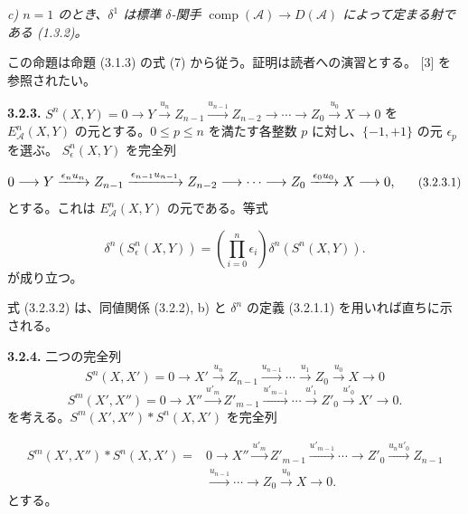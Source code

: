 \clearpage
{}%
\begingroup\small\setlength{\parskip}{0pt}\setlength{\emergencystretch}{1.5em}
\setlength{\abovedisplayskip}{4pt plus 2pt minus 2pt}%
\setlength{\belowdisplayskip}{4pt plus 2pt minus 2pt}%

\noindent\textit{c) $n=1$ のとき、$\delta^1$ は標準 $\delta$-関手
$\operatorname{comp}(\mathcal A)\longrightarrow D(\mathcal A)$
によって定まる射である (1.3.2)。}

この命題は命題 (3.1.3) の式 (7) から従う。証明は読者への演習とする。
[3] を参照されたい。

\medskip\noindent\textbf{3.2.3.}\quad
$S^n(X,Y)=0\longrightarrow Y\xrightarrow{u_n}Z_{n-1}
\xrightarrow{u_{n-1}}Z_{n-2}\longrightarrow\cdots\longrightarrow Z_0
\xrightarrow{u_0}X\longrightarrow0$
を $E_{\mathcal A}^{n}(X,Y)$ の元とする。$0\leq p\leq n$ を満たす各整数
$p$ に対し、$\{-1,+1\}$ の元 $\epsilon_p$ を選ぶ。
$S_{\epsilon}^{n}(X,Y)$ を完全列

\begin{equation}
\resizebox{0.94\textwidth}{!}{$\displaystyle
0\longrightarrow Y\xrightarrow{\epsilon_nu_n}Z_{n-1}
\xrightarrow{\epsilon_{n-1}u_{n-1}}Z_{n-2}\longrightarrow\cdots
\longrightarrow Z_0\xrightarrow{\epsilon_0u_0}X\longrightarrow0,
$}
\tag{3.2.3.1}
\end{equation}
とする。これは $E_{\mathcal A}^{n}(X,Y)$ の元である。等式

\begin{equation}
\delta^n(S_{\epsilon}^{n}(X,Y))=
\left(\prod_{i=0}^{n}\epsilon_i\right)\delta^n(S^n(X,Y)).
\tag{3.2.3.2}
\end{equation}
が成り立つ。

式 (3.2.3.2) は、同値関係 (3.2.2), b) と $\delta^n$ の定義
(3.2.1.1) を用いれば直ちに示される。

\medskip\noindent\textbf{3.2.4.}\quad
二つの完全列
\[
S^n(X,X')=0\longrightarrow X'\xrightarrow{u_n}Z_{n-1}
\xrightarrow{u_{n-1}}\cdots\xrightarrow{u_1}Z_0
\xrightarrow{u_0}X\longrightarrow0
\]
\[
S^m(X',X'')=0\longrightarrow X''\xrightarrow{u'_m}Z'_{m-1}
\xrightarrow{u'_{m-1}}\cdots\xrightarrow{u'_1}Z'_0
\xrightarrow{u'_0}X'\longrightarrow0.
\]
を考える。$S^m(X',X'')*S^n(X,X')$ を完全列

\begin{equation}
\begin{aligned}
S^m(X',X'')*S^n(X,X')={}&
0\longrightarrow X''\xrightarrow{u'_m}Z'_{m-1}
\xrightarrow{u'_{m-1}}\cdots\longrightarrow Z'_0
\xrightarrow{u_nu'_0}Z_{n-1}\\
&\xrightarrow{u_{n-1}}\cdots\longrightarrow Z_0
\xrightarrow{u_0}X\longrightarrow0.
\end{aligned}
\tag{3.2.4.1}
\end{equation}
とする。

